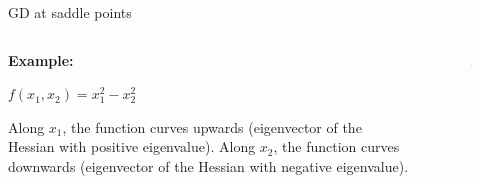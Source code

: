 \documentclass[11pt,compress,t,notes=noshow, xcolor=table]{beamer}
\begin{document}
\begin{vbframe}{GD at saddle points}
	
	\begin{columns}
		\begin{column}{0.48\textwidth}
			\textbf{Example: }
			\begin{center}
				$f(x_1, x_2) = x_1^2 - x_2^2$
			\end{center}
			Along $x_1$, the function curves upwards (eigenvector of the Hessian with positive eigenvalue). Along $x_2$, the function curves downwards (eigenvector of the Hessian with negative eigenvalue).
			
		\end{column}
		\begin{column}{0.48\textwidth}
			\begin{figure}
				\centering
				\includegraphics[width=4cm]{figure_man/saddlepoint.png}
			\end{figure} 
		\end{column}	
	\end{columns}
	
\end{vbframe}

\end{document}
